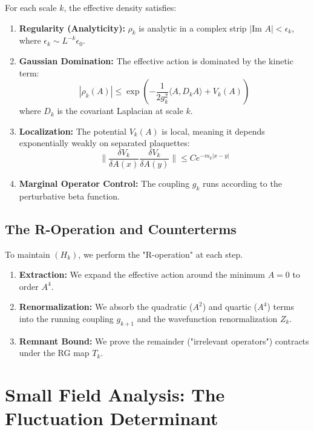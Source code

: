 \begin{definition}
For each scale $k$, the effective density satisfies:
\begin{enumerate}
    \item \textbf{Regularity (Analyticity):} $\rho_k$ is analytic in a complex strip $|\text{Im } A| < \epsilon_k$, where $\epsilon_k \sim L^{-k} \epsilon_0$.
    \item \textbf{Gaussian Domination:} The effective action is dominated by the kinetic term:
    \begin{equation}
    |\rho_k(A)| \le \exp\left( -\frac{1}{2g_k^2} \langle A, D_k A \rangle + V_k(A) \right)
    \end{equation}
    where $D_k$ is the covariant Laplacian at scale $k$.
    \item \textbf{Localization:} The potential $V_k(A)$ is local, meaning it depends exponentially weakly on separated plaquettes:
    \begin{equation}
    \|\frac{\delta V_k}{\delta A(x)} \frac{\delta V_k}{\delta A(y)}\| \le C e^{-m_k |x-y|}
    \end{equation}
    \item \textbf{Marginal Operator Control:} The coupling $g_k$ runs according to the perturbative beta function.
\end{enumerate}
\end{definition}

\subsection{The R-Operation and Counterterms}
To maintain $(H_k)$, we perform the "R-operation" at each step.
\begin{enumerate}
    \item \textbf{Extraction:} We expand the effective action around the minimum $A=0$ to order $A^4$.
    \item \textbf{Renormalization:} We absorb the quadratic ($A^2$) and quartic ($A^4$) terms into the running coupling $g_{k+1}$ and the wavefunction renormalization $Z_k$.
    \item \textbf{Remnant Bound:} We prove the remainder ("irrelevant operators") contracts under the RG map $T_k$.
\end{enumerate}

\section{Small Field Analysis: The Fluctuation Determinant}

